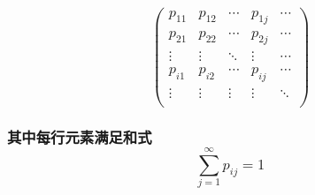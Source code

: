 \documentclass[11pt]{article}
\begin{document}
\subsubsection{\texorpdfstring{\[
        \left (\begin{matrix}
        p_{11} & p_{12} & \cdots &p_{1j}& \cdots  \\
        p_{21}  & p_{22} & \cdots &p_{2j}& \cdots \\
        \vdots & \vdots & \ddots & \vdots & \cdots \\
        p_{i1} & p_{i2} & \cdots & p_{ij} & \cdots \\
        \vdots & \vdots & \vdots & \vdots & \ddots \\
        \end{matrix} \right)
  \]}{
        \textbackslash{}left (\textbackslash{}begin\{matrix\}
        p\_\{11\} \& p\_\{12\} \& \textbackslash{}cdots \&p\_\{1j\}\& \textbackslash{}cdots  \textbackslash{}\textbackslash{}
        p\_\{21\}  \& p\_\{22\} \& \textbackslash{}cdots \&p\_\{2j\}\& \textbackslash{}cdots \textbackslash{}\textbackslash{}
        \textbackslash{}vdots \& \textbackslash{}vdots \& \textbackslash{}ddots \& \textbackslash{}vdots \& \textbackslash{}cdots \textbackslash{}\textbackslash{}
        p\_\{i1\} \& p\_\{i2\} \& \textbackslash{}cdots \& p\_\{ij\} \& \textbackslash{}cdots \textbackslash{}\textbackslash{}
        \textbackslash{}vdots \& \textbackslash{}vdots \& \textbackslash{}vdots \& \textbackslash{}vdots \& \textbackslash{}ddots \textbackslash{}\textbackslash{}
        \textbackslash{}end\{matrix\} \textbackslash{}right)
  }}\label{left-beginmatrix-p_11-p_12-cdots-p_1j-cdots-p_21-p_22-cdots-p_2j-cdots-vdots-vdots-ddots-vdots-cdots-p_i1-p_i2-cdots-p_ij-cdots-vdots-vdots-vdots-vdots-ddots-endmatrix-right}

\subsubsection{\texorpdfstring{其中每行元素满足和式\[\sum_{j=1}^{\infty} p_{ij}=1\]}{其中每行元素满足和式\textbackslash{}sum\_\{j=1\}\^{}\{\textbackslash{}infty\} p\_\{ij\}=1}}\label{ux5176ux4e2dux6bcfux884cux5143ux7d20ux6ee1ux8db3ux548cux5f0fsum_j1infty-p_ij1}
\end{document}
